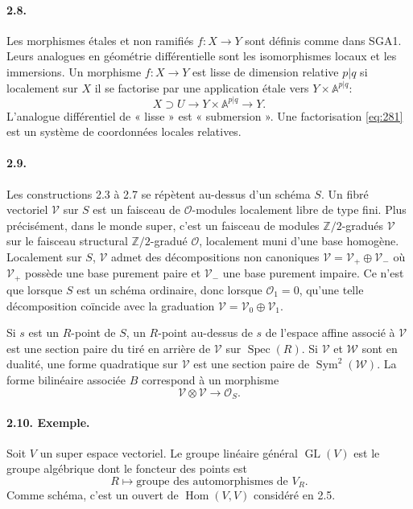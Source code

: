 \documentclass[11pt]{article}
\newcommand{\Z}{\mathbb Z}
\newcommand{\Spec}{\operatorname{Spec}}
\newcommand{\Hom}{\operatorname{Hom}}
\newcommand{\GL}{\operatorname{GL}}
\newcommand{\Sym}{\operatorname{Sym}}
\newcommand{\calO}{\mathcal O}
\begin{document}
\paragraph{2.8.}
Les morphismes étales et non ramifiés $f:X\to Y$ sont définis comme dans SGA1. Leurs analogues en géométrie différentielle sont les isomorphismes locaux et les immersions. Un morphisme $f:X\to Y$ est lisse de dimension relative $p|q$ si localement sur $X$ il se factorise par une application étale vers $Y\times\mathbb A^{p|q}$:
\begin{equation}
\label{eq:281}
X\supset U\longrightarrow Y\times\mathbb A^{p|q}\longrightarrow Y.
\end{equation}
L'analogue différentiel de « lisse » est « submersion ». Une factorisation \eqref{eq:281} est un système de coordonnées locales relatives.

\paragraph{2.9.}
Les constructions 2.3 à 2.7 se répètent au-dessus d'un schéma $S$. Un fibré vectoriel $\mathcal V$ sur $S$ est un faisceau de $\calO$-modules localement libre de type fini. Plus précisément, dans le monde super, c'est un faisceau de modules $\Z/2$-gradués $\mathcal V$ sur le faisceau structural $\Z/2$-gradué $\calO$, localement muni d'une base homogène. Localement sur $S$, $\mathcal V$ admet des décompositions non canoniques $\mathcal V=\mathcal V_+\oplus\mathcal V_-$ où $\mathcal V_+$ possède une base purement paire et $\mathcal V_-$ une base purement impaire. Ce n'est que lorsque $S$ est un schéma ordinaire, donc lorsque $\calO_1=0$, qu'une telle décomposition coïncide avec la graduation $\mathcal V=\mathcal V_0\oplus\mathcal V_1$.

Si $s$ est un $R$-point de $S$, un $R$-point au-dessus de $s$ de l'espace affine associé à $\mathcal V$ est une section paire du tiré en arrière de $\mathcal V$ sur $\Spec(R)$. Si $\mathcal V$ et $\mathcal W$ sont en dualité, une forme quadratique sur $\mathcal V$ est une section paire de $\Sym^2(\mathcal W)$. La forme bilinéaire associée $B$ correspond à un morphisme
\[
\mathcal V\otimes\mathcal V\longrightarrow \calO_S.
\]

\paragraph{2.10. Exemple.}
Soit $V$ un super espace vectoriel. Le groupe linéaire général $\GL(V)$ est le groupe algébrique dont le foncteur des points est
\[
R\longmapsto \text{groupe des automorphismes de }V_R.
\]
Comme schéma, c'est un ouvert de $\Hom(V,V)$ considéré en 2.5.
\end{document}
